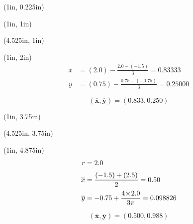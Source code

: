 \documentclass[10pt,oneside]{article}
\def\scale{1}
\begin{document}

\begin{textblock*}{6.775in}(1in, 0.225in)
\end{textblock*}

\begin{textblock*}{3in}(1in, 1in)
\end{textblock*}
\begin{textblock*}{3.25in}(4.525in, 1in)
	\cbox{
		\centering
		\def\scale{1}
		
	}
\end{textblock*}


\begin{textblock*}{3in}(1in, 2in)
	\large
	\begin{align*}
		\overline{x} &= (2.0)-\frac{2.0-(-1.5)}{3}=0.83333 \\[0.25em]
		\overline{y} &= (0.75)-\frac{0.75-(-0.75)}{3}=0.25000		
	\end{align*}
	\par
	$$ \bm{\left(\overline{x},\overline{y}\right) = (0.833, 0.250)} $$
\end{textblock*}



\begin{textblock*}{3in}(1in, 3.75in)
\end{textblock*}
\begin{textblock*}{3.25in}(4.525in, 3.75in)
	\cbox{
		\centering
		\def\scale{1}
		
	}
\end{textblock*}
\begin{textblock*}{3in}(1in, 4.875in)
	\large
	\begin{align*}
		r &= 2.0 \\[0.25em]
		\overline{x} &= \frac{(-1.5)+(2.5)}{2}=0.50 \\[0.25em]
		\overline{y} &= -0.75+\frac{4\!\times\!2.0}{3\pi}=0.098826
	\end{align*}
	\par
	$$ \bm{\left(\overline{x},\overline{y}\right) = (0.500, 0.988)} $$
\end{textblock*}
\end{document}
